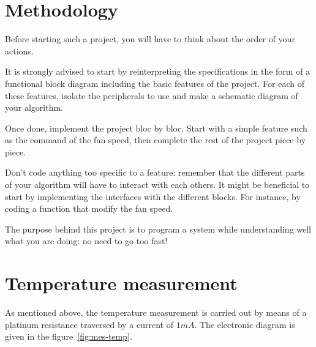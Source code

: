 \documentclass[11pt,a4paper]{article}
\theoremstyle{definition}%
\begin{document}
\section{Methodology}
Before starting such a project, you will have to think about the order of your actions.

It is strongly advised to start by reinterpreting the specifications in the form of a functional block diagram including the basic features of the project.
For each of these features, isolate the peripherals to use and make a schematic diagram of your algorithm.

Once done, implement the project bloc by bloc.
Start with a simple feature such as the command of the fan speed, then complete the rest of the project piece by piece.

Don't code anything too specific to a feature: remember that the different parts of your algorithm will have to interact with each others.
It might be beneficial to start by implementing the interfaces with the different blocks.
For instance, by coding a function that modify the fan speed.

The purpose behind this project is to program a system while understanding well what you are doing: no need to go too fast!





\section{Temperature measurement}

As mentioned above, the temperature measurement is carried out by means of a platinum resistance traversed by a current of $ 1 mA $.
The electronic diagram is given in the figure~\ref{fig:mes-temp}.
\end{document}
